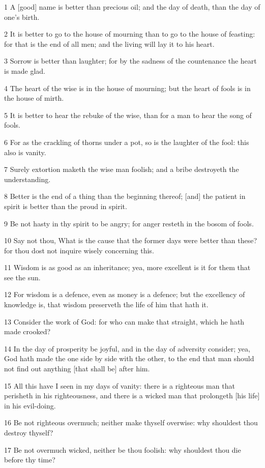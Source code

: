 \par 1 A [good] name is better than precious oil; and the day of death, than the day of one's birth.
\par 2 It is better to go to the house of mourning than to go to the house of feasting: for that is the end of all men; and the living will lay it to his heart.
\par 3 Sorrow is better than laughter; for by the sadness of the countenance the heart is made glad.
\par 4 The heart of the wise is in the house of mourning; but the heart of fools is in the house of mirth.
\par 5 It is better to hear the rebuke of the wise, than for a man to hear the song of fools.
\par 6 For as the crackling of thorns under a pot, so is the laughter of the fool: this also is vanity.
\par 7 Surely extortion maketh the wise man foolish; and a bribe destroyeth the understanding.
\par 8 Better is the end of a thing than the beginning thereof; [and] the patient in spirit is better than the proud in spirit.
\par 9 Be not hasty in thy spirit to be angry; for anger resteth in the bosom of fools.
\par 10 Say not thou, What is the cause that the former days were better than these? for thou dost not inquire wisely concerning this.
\par 11 Wisdom is as good as an inheritance; yea, more excellent is it for them that see the sun.
\par 12 For wisdom is a defence, even as money is a defence; but the excellency of knowledge is, that wisdom preserveth the life of him that hath it.
\par 13 Consider the work of God: for who can make that straight, which he hath made crooked?
\par 14 In the day of prosperity be joyful, and in the day of adversity consider; yea, God hath made the one side by side with the other, to the end that man should not find out anything [that shall be] after him.
\par 15 All this have I seen in my days of vanity: there is a righteous man that perisheth in his righteousness, and there is a wicked man that prolongeth [his life] in his evil-doing.
\par 16 Be not righteous overmuch; neither make thyself overwise: why shouldest thou destroy thyself?
\par 17 Be not overmuch wicked, neither be thou foolish: why shouldest thou die before thy time?

